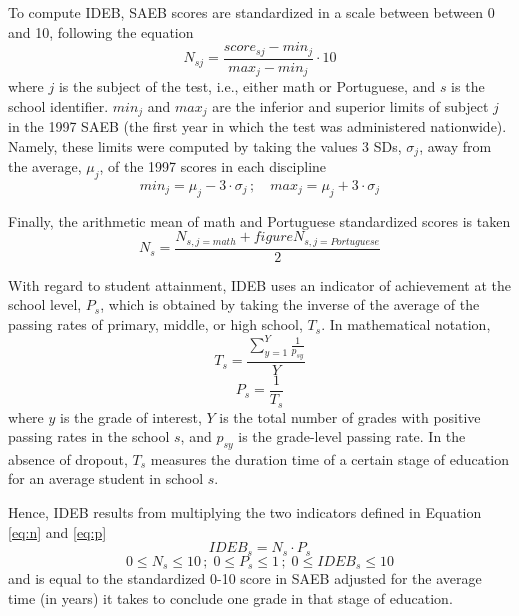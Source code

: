 \documentclass[11pt,a4paper]{article}
\begin{document}
To compute IDEB, SAEB scores are standardized in a scale between between 0 and 10, following the equation
\begin{equation}
    N_{sj} = \frac{score_{sj} - min_j}{max_j - min_j} \cdot 10
\end{equation}
where $j$ is the subject of the test, i.e., either math or Portuguese, and $s$ is the school identifier. $min_j$ and $max_j$ are the inferior and superior limits of subject $j$ in the 1997 SAEB (the first year in which the test was administered nationwide). Namely, these limits were computed by taking the values 3 SDs, $\sigma_{j}$, away from the average, $\mu_{j}$, of the 1997 scores in each discipline
\begin{equation}
    min_{j} = \mu_{j} - 3 \cdot \sigma_{j}\,;\quad max_{j} = \mu_{j} + 3 \cdot \sigma_{j}
\end{equation}

Finally, the arithmetic mean of math and Portuguese standardized scores is taken
\begin{equation} \label{eq:n}
    N_{s} = \frac{N_{s,j=math} +figure N_{s,j=Portuguese}}{2}
\end{equation}

With regard to student attainment, IDEB uses an indicator of achievement at the school level, $P_s$, which is obtained by taking the inverse of the average of the passing rates of primary, middle, or high school, $T_s$. In mathematical notation,
\begin{equation} 
    T_s = \frac{\sum_{y=1}^{Y} \frac{1}{p_{sy}}}{Y}
\end{equation}
\begin{equation} \label{eq:p}
    P_s = \frac{1}{T_s}
\end{equation}
where $y$ is the grade of interest, $Y$ is the total number of grades with positive passing rates in the school $s$, and $p_{sy}$ is the grade-level passing rate. In the absence of dropout, $T_s$ measures the duration time of a certain stage of education for an average student in school $s$. 

Hence, IDEB results from multiplying the two indicators defined in Equation \ref{eq:n} and \ref{eq:p}
\begin{equation}
    IDEB_s = N_s \cdot P_s
\end{equation}
\begin{equation}
    0 \leq N_s \leq 10\,;\; 0 \leq P_s \leq 1\,;\; 0 \leq IDEB_s \leq 10
\end{equation}
and is equal to the standardized 0-10 score in SAEB adjusted for the average time (in years) it takes to conclude one grade in that stage of education.
\end{document}
